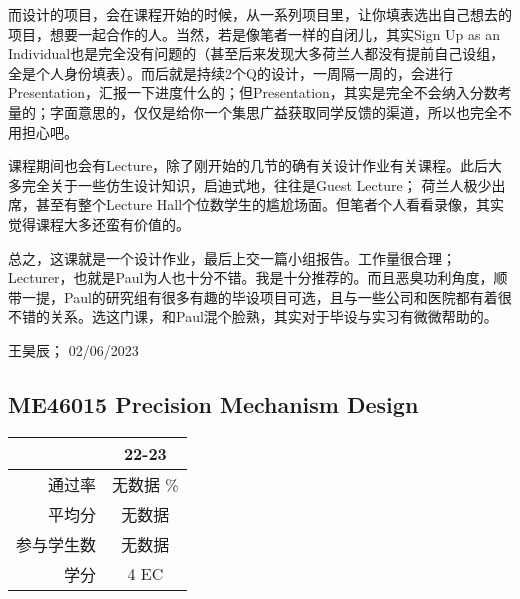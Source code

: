 而设计的项目，会在课程开始的时候，从一系列项目里，让你填表选出自己想去的项目，想要一起合作的人。当然，若是像笔者一样的自闭儿，其实Sign Up as an Individual也是完全没有问题的（甚至后来发现大多荷兰人都没有提前自己设组，全是个人身份填表）。而后就是持续2个Q的设计，一周隔一周的，会进行Presentation，汇报一下进度什么的；但Presentation，其实是完全不会纳入分数考量的；字面意思的，仅仅是给你一个集思广益获取同学反馈的渠道，所以也完全不用担心吧。

课程期间也会有Lecture，除了刚开始的几节的确有关设计作业有关课程。此后大多完全关于一些仿生设计知识，启迪式地，往往是Guest Lecture； 荷兰人极少出席，甚至有整个Lecture Hall个位数学生的尴尬场面。但笔者个人看看录像，其实觉得课程大多还蛮有价值的。

总之，这课就是一个设计作业，最后上交一篇小组报告。工作量很合理；Lecturer，也就是Paul为人也十分不错。我是十分推荐的。而且恶臭功利角度，顺带一提，Paul的研究组有很多有趣的毕设项目可选，且与一些公司和医院都有着很不错的关系。选这门课，和Paul混个脸熟，其实对于毕设与实习有微微帮助的。
\begin{flushright}
王昊辰； 02/06/2023
\end{flushright}

\subsection{ME46015 Precision Mechanism Design}\hypertarget{ME46015}{} 
\begin{minipage}{0.45\textwidth}
\centering
{}
\end{minipage}%
\begin{minipage}{0.45\textwidth}
\raggedleft
\begin{tabular}{r|c}
\textbf{ } & \textbf{22-23} \\ \hline
通过率 &无数据 \%\\ 
平均分 &无数据  \\ 
参与学生数 &无数据  \\ 
学分 &4  EC\\
\end{tabular}
\end{minipage}\\

